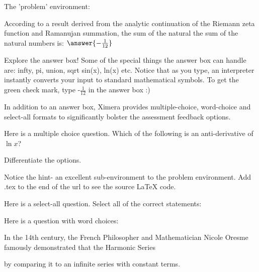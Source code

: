 \documentclass{ximera}
\begin{document}
The 'problem' environment:
\begin{problem}
According to a result derived from the analytic continuation of the Riemann zeta function and Ramanujan summation, the sum of the natural the sum of the natural numbers is: $\answer{-\frac{1}{12}}$
\end{problem}

Explore the answer box!
Some of the special things the answer box can handle are: infty, pi, union, sqrt sin(x), ln(x) etc. Notice that as you type, an interpreter instantly converts your input to standard mathematical symbols. To get the green check mark, 
type -$\frac{1}{12}$ in the answer box :)

In addition to an answer box, Ximera provides multiple-choice, word-choice and select-all formats to significantly bolster the assessment feedback options.
\begin{problem}
Here is a multiple choice question.
Which of the following is an anti-derivative of $\ln x$?
    \begin{multipleChoice}
    \end{multipleChoice}
    \begin{hint}
        Differentiate the options.
    \end{hint}
\end{problem}
Notice the hint- an excellent sub-environment to the problem environment.
Add .tex to the end of the url to see the source LaTeX code.

\begin{problem}
Here is a select-all question.
Select all of the correct statements:
    \begin{selectAll}
    \end{selectAll}
\end{problem}

Here is a question with word choices:
\begin{question}
    In the 14th century, the French Philosopher and Mathematician Nicole Oresme famously demonstrated that the Harmonic Series \begin{wordChoice}{}\end{wordChoice} by comparing it to an infinite series with constant terms.
\end{question}
\end{document}
